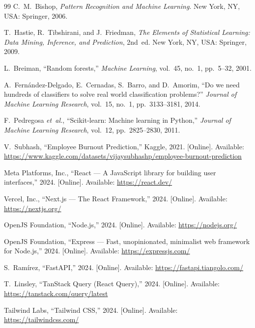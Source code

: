 \documentclass[12pt,a4paper]{article}
\begin{document}
\begin{thebibliography}{99}
C.~M.~Bishop, \textit{Pattern Recognition and Machine Learning}.
New York, NY, USA: Springer, 2006.

T.~Hastie, R.~Tibshirani, and J.~Friedman, \textit{The Elements of
Statistical Learning: Data Mining, Inference, and Prediction}, 2nd~ed.
New York, NY, USA: Springer, 2009.

L.~Breiman, ``Random forests,'' \textit{Machine Learning}, vol.~45,
no.~1, pp.~5--32, 2001.

A.~Fernández-Delgado, E.~Cernadas, S.~Barro, and D.~Amorim, ``Do we
need hundreds of classifiers to solve real world classification
problems?'' \textit{Journal of Machine Learning Research}, vol.~15,
no.~1, pp.~3133--3181, 2014.

F.~Pedregosa \textit{et~al.}, ``Scikit-learn: Machine learning in
Python,'' \textit{Journal of Machine Learning Research}, vol.~12,
pp.~2825--2830, 2011.

V.~Subhash, ``Employee Burnout Prediction,'' Kaggle, 2021. [Online].
Available: \url{https://www.kaggle.com/datasets/vijaysubhashp/employee-burnout-prediction}


Meta Platforms, Inc., ``React --- A JavaScript library for building user
interfaces,'' 2024. [Online]. Available: \url{https://react.dev/}

Vercel, Inc., ``Next.js --- The React Framework,'' 2024. [Online].
Available: \url{https://nextjs.org/}

OpenJS Foundation, ``Node.js,'' 2024. [Online]. Available:
\url{https://nodejs.org/}

OpenJS Foundation, ``Express --- Fast, unopinionated, minimalist web
framework for Node.js,'' 2024. [Online]. Available:
\url{https://expressjs.com/}

S.~Ramírez, ``FastAPI,'' 2024. [Online]. Available:
\url{https://fastapi.tiangolo.com/}

T.~Linsley, ``TanStack Query (React Query),'' 2024. [Online]. Available:
\url{https://tanstack.com/query/latest}

Tailwind Labs, ``Tailwind CSS,'' 2024. [Online]. Available:
\url{https://tailwindcss.com/}


\end{thebibliography}
\end{document}
